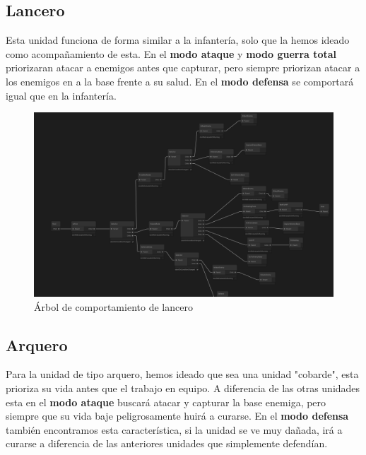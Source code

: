 \subsection{Lancero}
Esta unidad funciona de forma similar a la infantería, solo que la hemos ideado como acompañamiento de esta. En el \textbf{modo ataque} y \textbf{modo guerra total} priorizaran atacar a enemigos antes que capturar, pero siempre priorizan atacar a los enemigos en a la base frente a su salud. En el \textbf{modo defensa} se comportará igual que en la infantería. 
\begin{figure}[H]
    \centering
    \includegraphics[scale=0.3]{doc/images/ArbolLancero.png}
    \caption{Árbol de comportamiento de lancero}
    \label{fig:lancer}
\end{figure}

\subsection{Arquero}
Para la unidad de tipo arquero, hemos ideado que sea una unidad "cobarde", esta prioriza su vida antes que el trabajo en equipo. A diferencia de las otras unidades esta en el \textbf{modo ataque} buscará atacar y capturar la base enemiga, pero siempre que su vida baje peligrosamente huirá a curarse. En el \textbf{modo defensa} también encontramos esta característica, si la unidad se ve muy dañada, irá a curarse a diferencia de las anteriores unidades que simplemente defendían.

